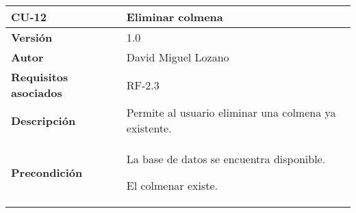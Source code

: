 \begin{longtable}[]{@{}ll@{}}
\toprule
\begin{minipage}[b]{0.29\columnwidth}\raggedright\strut
\textbf{CU-12}\strut
\end{minipage} & \begin{minipage}[b]{0.65\columnwidth}\raggedright\strut
\textbf{Eliminar colmena}\strut
\end{minipage}\tabularnewline
\midrule
\endhead
\begin{minipage}[t]{0.29\columnwidth}\raggedright\strut
\textbf{Versión}\strut
\end{minipage} & \begin{minipage}[t]{0.65\columnwidth}\raggedright\strut
1.0\strut
\end{minipage}\tabularnewline
\begin{minipage}[t]{0.29\columnwidth}\raggedright\strut
\textbf{Autor}\strut
\end{minipage} & \begin{minipage}[t]{0.65\columnwidth}\raggedright\strut
David Miguel Lozano\strut
\end{minipage}\tabularnewline
\begin{minipage}[t]{0.29\columnwidth}\raggedright\strut
\textbf{Requisitos asociados}\strut
\end{minipage} & \begin{minipage}[t]{0.65\columnwidth}\raggedright\strut
RF-2.3\strut
\end{minipage}\tabularnewline
\begin{minipage}[t]{0.29\columnwidth}\raggedright\strut
\textbf{Descripción}\strut
\end{minipage} & \begin{minipage}[t]{0.65\columnwidth}\raggedright\strut
Permite al usuario eliminar una colmena ya existente.\strut
\end{minipage}\tabularnewline
\begin{minipage}[t]{0.29\columnwidth}\raggedright\strut
\textbf{Precondición}\strut
\end{minipage} & \begin{minipage}[t]{0.65\columnwidth}\raggedright\strut
La base de datos se encuentra disponible.

El colmenar existe.


\end{minipage}
\end{longtable}
